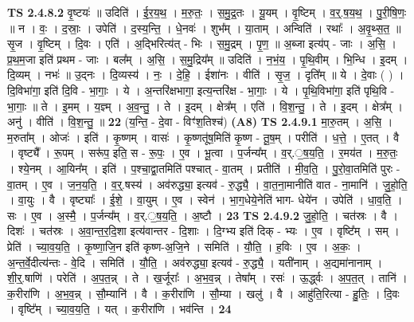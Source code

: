 \documentclass[17pt]{extarticle}
\begin{document}
                  \newline
                                \textbf{ TS 2.4.8.2} \newline
                  वृ॒ष्टयः॑ ॥ उदिति॑ । ई॒र॒य॒थ॒ । म॒रु॒तः॒ । स॒मु॒द्र॒तः । यू॒यम् । वृ॒ष्टिम् । व॒र्॒.ष॒य॒थ॒ । पु॒री॒षि॒णः॒ ॥ न । वः॒ । द॒स्राः॒ । उपेति॑ । द॒स्य॒न्ति॒ । धे॒नवः॑ ।   शुभ᳚म् । या॒ताम् । अन्विति॑ । रथाः᳚ । अ॒वृ॒थ्स॒त॒ ॥ सृ॒ज ।  वृ॒ष्टिम् । दि॒वः । एति॑ । अ॒द्भिरित्य॑त् - भिः । स॒मु॒द्रम् । पृ॒ण॒ ॥ अ॒ब्जा इत्य॑प् - जाः । अ॒सि॒ । प्र॒थ॒म॒जा इति॑ प्रथम - जाः । बल᳚म् । अ॒सि॒ । स॒मु॒द्रिय᳚म् ॥ उदिति॑ । न॒भं॒य॒ । पृ॒थि॒वीम् । भि॒न्धि । इ॒दम् । दि॒व्यम् । नभः॑ ॥ उ॒द्नः । दि॒व्यस्य॑ । नः॒ । दे॒हि॒ । ईशा॑नः । वीति॑ । सृ॒ज॒ । दृति᳚म् ॥ ये । दे॒वाः ( ) । दि॒विभा॑गा॒ इति॑ दि॒वि - भा॒गाः॒ । ये । अ॒न्तरि॑क्षभागा॒ इत्य॒न्तरि॑क्ष - भा॒गाः॒ । ये । पृ॒थि॒विभा॑गा॒ इति॑ पृथि॒वि - भा॒गाः॒ ॥ ते । इ॒मम् । य॒ज्ञ्म् । अ॒व॒न्तु॒ । ते । इ॒दम् । क्षेत्र᳚म् । एति॑ । वि॒श॒न्तु॒ । ते । इ॒दम् । क्षेत्र᳚म् । अनु॑ । वीति॑ । वि॒श॒न्तु॒ ॥ \textbf{  22} \newline
                  \newline
                      (य॒न्ति॒ - दे॒वा - विꣳ॑श॒तिश्च॑)  \textbf{(A8)} \newline \newline
                                \textbf{ TS 2.4.9.1} \newline
                  मा॒रु॒तम् । अ॒सि॒ । म॒रुता᳚म् । ओजः॑ । इति॑ । कृ॒ष्णम् । वासः॑ । कृ॒ष्णतू॑ष॒मिति॑ कृ॒ष्ण - तू॒ष॒म् । परीति॑ । ध॒त्ते॒ । ए॒तत् । वै । वृष्ट्यै᳚ । रू॒पम् । सरू॑प॒ इति॒ स - रू॒पः॒ ।  ए॒व । भू॒त्वा । प॒र्जन्य᳚म् । व॒र्.॒ष॒य॒ति॒ । र॒मय॑त । म॒रु॒तः॒ । श्ये॒नम् । आ॒यिन᳚म् । इति॑ । प॒श्चा॒द्वा॒तमिति॑ पश्चात् - वा॒तम् । प्रतीति॑ । मी॒व॒ति॒ । पु॒रो॒वा॒तमिति॑ पुरः - वा॒तम् । ए॒व । ज॒न॒य॒ति॒ । व॒र्॒.षस्य॑ । अव॑रुद्ध्या॒ इत्यव॑ - रु॒द्ध्यै॒ । वा॒त॒ना॒मानीति॑ वात - ना॒मानि॑ । जु॒हो॒ति॒ । वा॒युः । वै । वृष्ट्याः᳚ । ई॒शे॒ ।   वा॒युम् । ए॒व । स्वेन॑ । भा॒ग॒धेये॒नेति॑ भाग- धेये॑न । उपेति॑ । धा॒व॒ति॒ । सः । ए॒व । अ॒स्मै॒ । प॒र्जन्य᳚म् । व॒र्.॒ष॒य॒ति॒ । अ॒ष्टौ । \textbf{  23} \newline
                  \newline
                                \textbf{ TS 2.4.9.2} \newline
                  जु॒हो॒ति॒ । चत॑स्रः । वै । दिशः॑ । चत॑स्रः । अ॒वा॒न्त॒र॒दि॒शा इत्य॑वान्तर - दि॒शाः । दि॒ग्भ्य इति॑ दिक् - भ्यः । ए॒व । वृष्टि᳚म् । सम् । प्रेति॑ । च्या॒व॒य॒ति॒ । कृ॒ष्णा॒जि॒न इति॑ कृष्ण-अ॒जि॒ने । समिति॑ । यौ॒ति॒ । ह॒विः । ए॒व । अ॒कः॒ । अ॒न्त॒र्वे॒दीत्य॑न्तः - वे॒दि । समिति॑ । यौ॒ति॒ । अव॑रुद्ध्या॒ इत्यव॑ - रु॒द्ध्यै॒ । यती॑नाम् । अ॒द्यमा॑नानाम् । शी॒र्॒.षाणि॑ । परेति॑ । अ॒प॒त॒न्न् । ते । ख॒र्जूराः᳚ । अ॒भ॒व॒न्न् । तेषा᳚म् । रसः॑ । ऊ॒र्द्ध्वः । अ॒प॒त॒त् । तानि॑ । क॒रीरा॑णि । अ॒भ॒व॒न्न् ।  सौ॒म्यानि॑ । वै । क॒रीरा॑णि । सौ॒म्या । खलु॑ । वै । आहु॑ति॒रित्या - हु॒तिः॒ । दि॒वः । वृष्टि᳚म् । च्या॒व॒य॒ति॒ । यत् । क॒रीरा॑णि । भव॑न्ति । \textbf{  24} \newline
\end{document}
